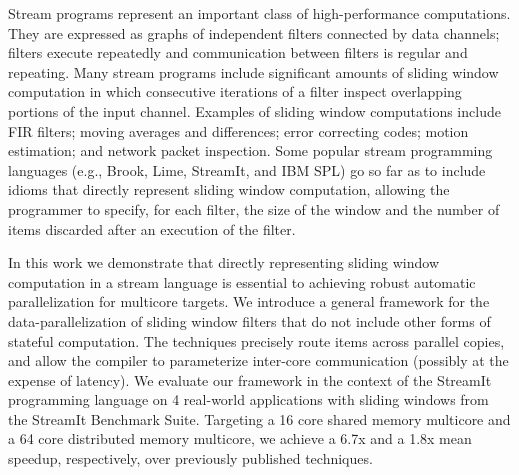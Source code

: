 Stream programs represent an important class of high-performance
computations. They are expressed as graphs of independent filters
connected by data channels; filters execute repeatedly and
communication between filters is regular and repeating.  Many stream
programs include significant amounts of sliding window computation in
which consecutive iterations of a filter inspect overlapping portions
of the input channel.  Examples of sliding window computations include
FIR filters; moving averages and differences; error correcting
codes; motion estimation; and network packet inspection.  Some popular
stream programming languages (e.g., Brook, Lime, StreamIt, and IBM
SPL) go so far as to include idioms that directly represent sliding
window computation, allowing the programmer to specify, for each
filter, the size of the window and the number of items discarded after
an execution of the filter.

In this work we demonstrate that directly representing sliding window
computation in a stream language is essential to achieving robust
automatic parallelization for multicore targets. We introduce a
general framework for the data-parallelization of sliding window
filters that do not include other forms of stateful computation.  The
techniques precisely route items across parallel copies, and allow the
compiler to parameterize inter-core communication (possibly at the
expense of latency).  We evaluate our framework in the context of the
StreamIt programming language on 4 real-world applications with
sliding windows from the StreamIt Benchmark Suite.  Targeting
a 16 core shared memory multicore and a 64 core distributed memory
multicore, we achieve a 6.7x and a 1.8x mean
speedup, respectively, over previously published techniques.
